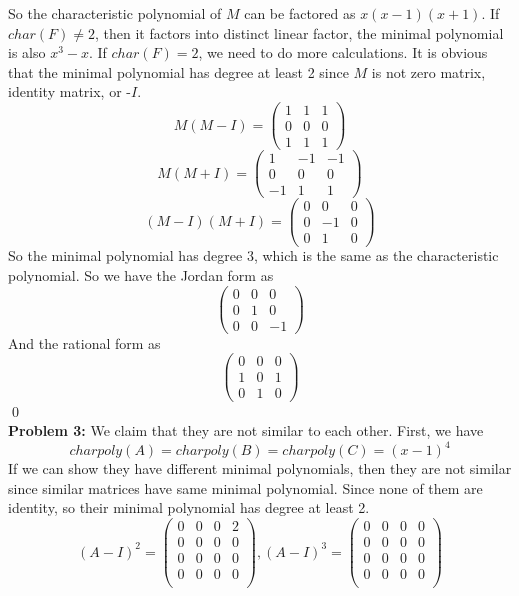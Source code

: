 \documentclass[12pt]{amsart}
\begin{document}
So the characteristic polynomial of $M$ can be factored as $x(x-1)(x+1)$. If $char(F)\neq 2$, then it factors into distinct linear factor, the minimal polynomial is also $x^3-x$. If $char(F)=2$, we need to do more calculations. It is obvious that the minimal polynomial has degree at least 2 since $M$ is not zero matrix, identity matrix, or -$I$. 
\[M(M-I)=\begin{pmatrix}
    1&1&1\\
    0&0&0\\
    1&1&1
\end{pmatrix}\]
\[M(M+I)=\begin{pmatrix}
    1&-1&-1\\
    0&0&0\\
    -1&1&1
\end{pmatrix}\]
\[(M-I)(M+I)=\begin{pmatrix}
    0&0&0\\
    0&-1&0\\
    0&1&0
\end{pmatrix}\]
So the minimal polynomial has degree 3, which is the same as the characteristic polynomial. So we have the Jordan form as 
\[\begin{pmatrix}
    0&0&0\\
    0&1&0\\
    0&0&-1
\end{pmatrix}\]
And the rational form as 
\[\begin{pmatrix}
    0&0&0\\
    1&0&1\\
    0&1&0
\end{pmatrix}\]
\qed\\
\textbf{Problem 3:} We claim that they are not similar to each other. First, we have 
\[charpoly(A)=charpoly(B)=charpoly(C)=(x-1)^4\]
If we can show they have different minimal polynomials, then they are not similar since similar matrices have same minimal polynomial. Since none of them are identity, so their minimal polynomial has degree at least 2.
\[(A-I)^2=\begin{pmatrix}
    0&0&0&2\\
    0&0&0&0\\
    0&0&0&0\\
    0&0&0&0\\
\end{pmatrix}, (A-I)^3=\begin{pmatrix}
    0&0&0&0\\
    0&0&0&0\\
    0&0&0&0\\
    0&0&0&0\\
\end{pmatrix}\]
\end{document}
